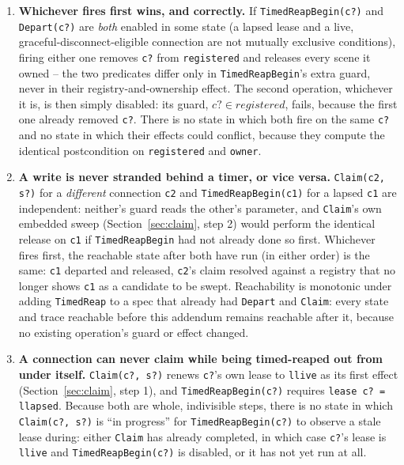 \documentclass[a4paper,10pt,fleqn]{article}
\begin{document}
\begin{enumerate}
  \item \textbf{Whichever fires first wins, and correctly.} If
    \texttt{TimedReapBegin(c?)} and \texttt{Depart(c?)} are \emph{both}
    enabled in some state (a lapsed lease and a live,
    graceful-disconnect-eligible connection are not mutually exclusive
    conditions), firing either one removes \texttt{c?} from
    \texttt{registered} and releases every scene it owned -- the two
    predicates differ only in \texttt{TimedReapBegin}'s extra guard, never
    in their registry-and-ownership effect. The second operation, whichever
    it is, is then simply disabled: its guard, \texttt{$c? \in registered$},
    fails, because the first one already removed \texttt{c?}. There is no
    state in which both fire on the same \texttt{c?} and no state in
    which their effects could conflict, because they compute the
    identical postcondition on \texttt{registered} and \texttt{owner}.
  \item \textbf{A write is never stranded behind a timer, or vice versa.}
    \texttt{Claim(c2, s?)} for a \emph{different} connection \texttt{c2}
    and \texttt{TimedReapBegin(c1)} for a lapsed \texttt{c1} are
    independent: neither's guard reads the other's parameter, and
    \texttt{Claim}'s own embedded sweep (Section~\ref{sec:claim}, step 2)
    would perform the identical release on \texttt{c1} if
    \texttt{TimedReapBegin} had not already done so first. Whichever fires
    first, the reachable state after both have run (in either order) is
    the same: \texttt{c1} departed and released, \texttt{c2}'s claim
    resolved against a registry that no longer shows \texttt{c1} as a
    candidate to be swept. Reachability is monotonic under adding
    \texttt{TimedReap} to a spec that already had \texttt{Depart} and
    \texttt{Claim}: every state and trace reachable before this addendum
    remains reachable after it, because no existing operation's guard or
    effect changed.
  \item \textbf{A connection can never claim while being timed-reaped
    out from under itself.} \texttt{Claim(c?, s?)} renews \texttt{c?}'s
    own lease to \texttt{llive} as its first effect
    (Section~\ref{sec:claim}, step 1), and \texttt{TimedReapBegin(c?)}
    requires \texttt{lease~c? = llapsed}. Because both are whole,
    indivisible steps, there is no state in which \texttt{Claim(c?, s?)}
    is ``in progress'' for \texttt{TimedReapBegin(c?)} to observe a stale
    lease during: either \texttt{Claim} has already completed, in which
    case \texttt{c?}'s lease is \texttt{llive} and \texttt{TimedReapBegin(c?)}
    is disabled, or it has not yet run at all.
\end{enumerate}
\end{document}
